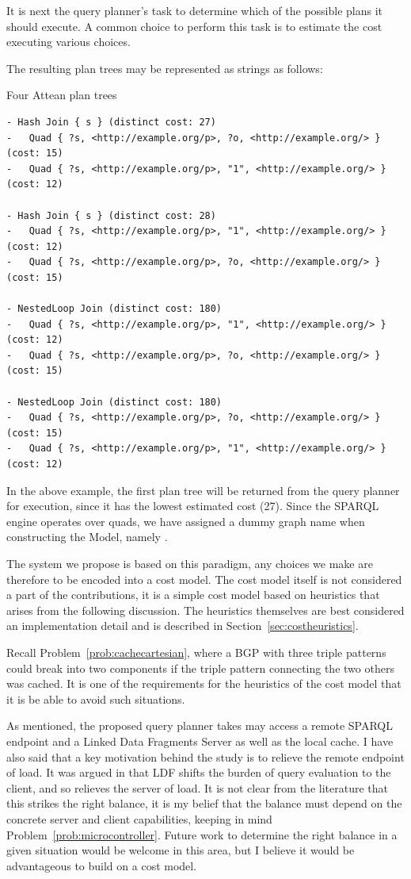 It is next the query planner's task to determine which of the possible
plans it should execute. A common choice to perform this task is to
estimate the cost executing various choices.

The resulting plan trees may be represented as strings as follows:
\begin{example}{Four Attean plan trees}
\begin{verbatim}
- Hash Join { s } (distinct cost: 27)
-   Quad { ?s, <http://example.org/p>, ?o, <http://example.org/> } (cost: 15)
-   Quad { ?s, <http://example.org/p>, "1", <http://example.org/> } (cost: 12)

- Hash Join { s } (distinct cost: 28)
-   Quad { ?s, <http://example.org/p>, "1", <http://example.org/> } (cost: 12)
-   Quad { ?s, <http://example.org/p>, ?o, <http://example.org/> } (cost: 15)

- NestedLoop Join (distinct cost: 180)
-   Quad { ?s, <http://example.org/p>, "1", <http://example.org/> } (cost: 12)
-   Quad { ?s, <http://example.org/p>, ?o, <http://example.org/> } (cost: 15)

- NestedLoop Join (distinct cost: 180)
-   Quad { ?s, <http://example.org/p>, ?o, <http://example.org/> } (cost: 15)
-   Quad { ?s, <http://example.org/p>, "1", <http://example.org/> } (cost: 12)
\end{verbatim}
\end{example}
In the above example, the first plan tree will be returned from the
query planner for execution, since it has the lowest estimated cost
(27). Since the SPARQL engine operates over quads, we have assigned a
dummy graph name when constructing the Model, namely
. 


The system we propose is based on this paradigm, any choices we make
are therefore to be encoded into a cost model. The cost model itself
is not considered a part of the contributions, it is a simple cost
model based on heuristics that arises from the following
discussion. The heuristics themselves are best considered an
implementation detail and is described in
Section~\ref{sec:costheuristics}.

Recall Problem~\ref{prob:cachecartesian}, where a BGP with three
triple patterns could break into two components if the triple pattern
connecting the two others was cached. It is one of the requirements
for the heuristics of the cost model that it is be able to avoid such
situations.

As mentioned, the proposed query planner takes may access a remote
SPARQL endpoint and a Linked Data Fragments Server as well as the
local cache. I have also said that a key motivation behind the study
is to relieve the remote endpoint of load. It was argued in
\cite{verborgh2014querying} that LDF shifts the burden of query
evaluation to the client, and so relieves the server of load. It is
not clear from the literature that this strikes the right balance, it
is my belief that the balance must depend on the concrete server and
client capabilities, keeping in mind
Problem~\ref{prob:microcontroller}. Future work to determine the right
balance in a given situation would be welcome in this area, but I
believe it would be advantageous to build on a cost model.

